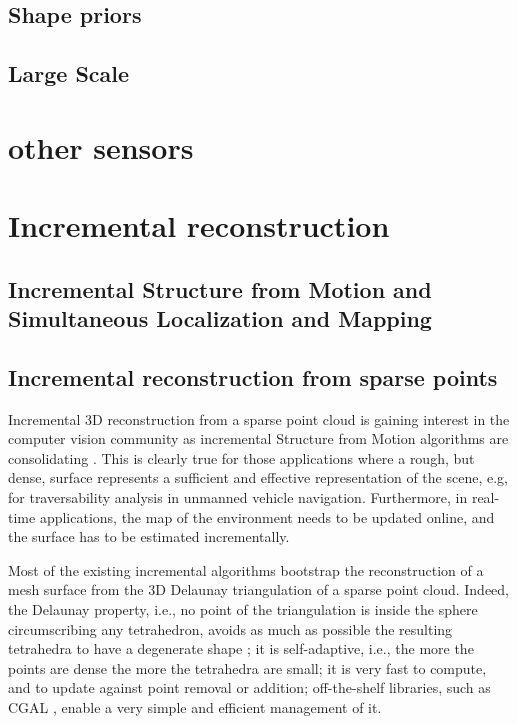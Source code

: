 \subsection{Shape priors}
\subsection{Large Scale}
\section{other sensors}


\section{Incremental reconstruction}
\subsection{Incremental Structure from Motion and Simultaneous Localization and Mapping}

\subsection{Incremental reconstruction from sparse points}
Incremental 3D reconstruction from a sparse point cloud is gaining interest in the computer vision community as incremental Structure from Motion algorithms are consolidating  \cite{wu13}. 
This is clearly true for those applications where a rough, but dense, surface represents a sufficient and effective representation of the scene, e.g, for traversability analysis in unmanned vehicle navigation. 
Furthermore, in real-time applications, the map of the environment needs to be updated online, and the surface has to be estimated incrementally. 

Most of the existing incremental algorithms \cite{Lovi_et_al_11,Pan_et_al09,litvinov_lhuillier_13,litvinov_Lhiuller14} bootstrap the reconstruction of a mesh surface from the 3D Delaunay triangulation of a sparse point cloud. Indeed, the Delaunay property, i.e., no point of the triangulation is inside the sphere circumscribing any tetrahedron, avoids as much as possible the resulting tetrahedra to have a degenerate shape \cite{Maur_02}; it is self-adaptive, i.e., the more the points are dense the more the tetrahedra are small; it is very fast to compute, and to  update against point removal or addition; off-the-shelf libraries, such as CGAL \cite{cgal}, enable a very simple and efficient management of it. 


